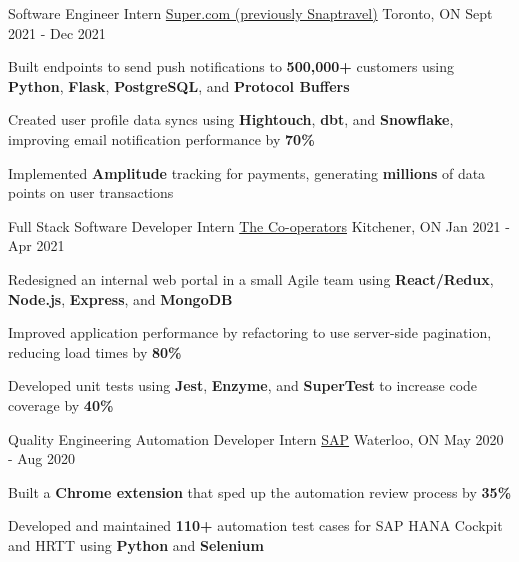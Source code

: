 \begin{cventries}
  \cventry
    {Software Engineer Intern} %
    {\href{https://www.super.com/}{Super.com (previously Snaptravel)}} %
    {Toronto, ON} %
    {Sept 2021 - Dec 2021} %
    {
      \begin{cvitems} %
      \item {Built endpoints to send push notifications to \textbf{500,000+} customers using \textbf{Python}, \textbf{Flask}, \textbf{PostgreSQL}, and \textbf{Protocol Buffers}}
      \item {Created user profile data syncs using \textbf{Hightouch}, \textbf{dbt}, and \textbf{Snowflake}, improving email notification performance by \textbf{70\%}}
      \item {Implemented \textbf{Amplitude} tracking for payments, generating \textbf{millions} of data points on user transactions}
      \end{cvitems}
    }

  \cventry
    {Full Stack Software Developer Intern} %
    {\href{https://www.cooperators.ca/}{The Co-operators}} %
    {Kitchener, ON} %
    {Jan 2021 - Apr 2021} %
    {
      \begin{cvitems} %
      \item {Redesigned an internal web portal in a small Agile team using \textbf{React/Redux}, \textbf{Node.js}, \textbf{Express}, and \textbf{MongoDB}}
      \item {Improved application performance by refactoring to use server-side pagination, reducing load times by \textbf{80\%}}
      \item {Developed unit tests using \textbf{Jest}, \textbf{Enzyme}, and \textbf{SuperTest} to increase code coverage by \textbf{40\%}}
      \end{cvitems}
    }
    
  \cventry
    {Quality Engineering Automation Developer Intern} %
    {\href{https://www.sap.com/canada/index.html}{SAP}} %
    {Waterloo, ON} %
    {May 2020 - Aug 2020} %
    {
      \begin{cvitems} %
      \item {Built a \textbf{Chrome extension} that sped up the automation review process by \textbf{35\%}}
      \item {Developed and maintained \textbf{110+} automation test cases for SAP HANA Cockpit and HRTT using \textbf{Python} and \textbf{Selenium}}
      \end{cvitems}
    }
       
\end{cventries}
